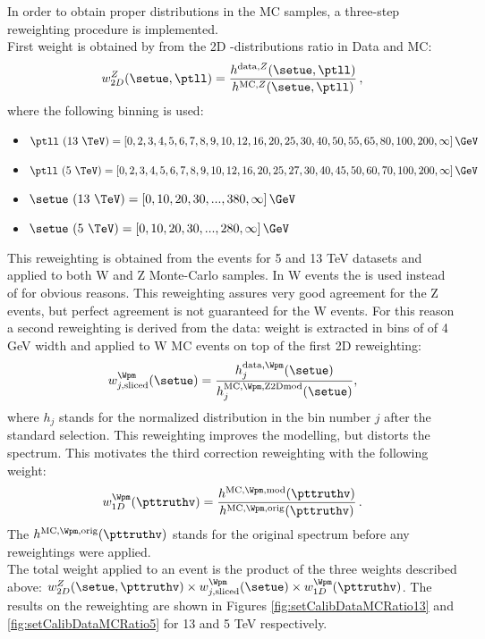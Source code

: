 	 In order to obtain proper distributions in the MC samples, a three-step reweighting procedure is implemented. \\
	 First weight is obtained by from the 2D \setue-\ptv distributions ratio in Data and MC:
	 \begin{equation}
	 w_{2D}^{Z}(\setue, \ptll) = \frac{h^{\mathrm{data}, Z}(\setue, \ptll)}{h^{\mathrm{MC}, Z}(\setue, \ptll)}\,,
	 \end{equation}
	 where the following binning is used:
	 \begin{itemize}
	 	\item $\ptll~(13~\TeV) = [ 0, 2, 3, 4, 5, 6, 7, 8, 9, 10, 12, 16, 20, 25, 30, 40, 50, 55, 65, 80, 100, 200, \infty]\,\GeV$
	 	\item $\ptll~(5~\TeV) = [ 0, 2, 3, 4, 5, 6, 7, 8, 9, 10, 12, 16, 20, 25, 27, 30, 40, 45, 50, 60, 70, 100, 200, \infty]\,\GeV$
	 	\item $\setue~(13~\TeV) = [ 0, 10, 20, 30, ... , 380, \infty]\,\GeV$
	 	\item $\setue~(5~\TeV) = [ 0, 10, 20, 30, ... , 280, \infty]\,\GeV$
	 \end{itemize}
     This reweighting is obtained from the \Zmm events for 5 and 13 TeV datasets and applied to both W and Z Monte-Carlo samples. In W events the \ptv is used instead of \ptll for obvious reasons. This reweighting assures very good agreement for the Z events, but perfect agreement is not guaranteed for the W events. For this reason a second reweighting is derived from the data: \setue weight is extracted in bins of \ut of 4 GeV width and applied to W MC events on top of the first 2D reweighting:
     \begin{equation}
     w_{j, \mathrm{sliced}}^{\Wpm}(\setue) = \frac{h_{j}^{\mathrm{data}, \Wpm}(\setue)}{h_{j}^{\mathrm{MC}, \Wpm, \mathrm{Z2D mod}}(\setue)},
     \label{eq:1dslicedrew}
     \end{equation}
     where $h_j$ stands for the normalized \setue distribution in the \ut bin number $j$ after the standard selection. This reweighting improves the \setue modelling, but distorts the \ptv spectrum. This motivates the third correction reweighting with the following weight: 
     \begin{equation}
     w_{1D}^{\Wpm}(\pttruthv) = \frac{h^{\mathrm{MC}, \Wpm, \mathrm{mod}}(\pttruthv)}{h^{\mathrm{MC}, \Wpm, \mathrm{orig}}(\pttruthv)}\,.
     \label{eq:1drew}
     \end{equation}
     The $h^{\mathrm{MC}, \Wpm, \mathrm{orig}}(\pttruthv)$ stands for the original \pttruthv spectrum before any reweightings were applied. \\
     The total weight applied to an event is the product of the three weights described above: $ w_{2D}^{Z}(\setue, \pttruthv) \times w_{j, \mathrm{sliced}}^{\Wpm}(\setue) \times
     w_{1D}^{\Wpm}(\pttruthv)$. The results on the reweighting are shown in Figures \ref{fig:setCalibDataMCRatio13} and \ref{fig:setCalibDataMCRatio5} for 13 and 5 TeV respectively.\\
     
